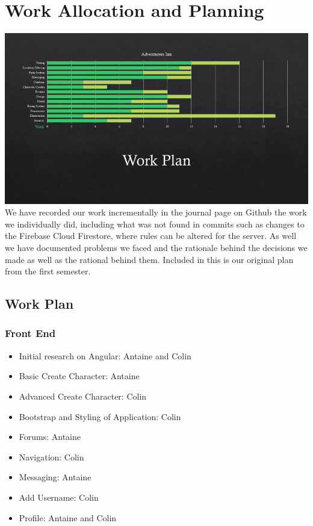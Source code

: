\section{Work Allocation and Planning}
\includegraphics[scale=0.8]{./img/WorkPlanOrginal.png}
We have recorded our work incrementally in the journal page on Github the work we individually did, including what was not found in commits such as changes to the Firebase Cloud Firestore, where rules can be altered for the server. As well we have documented problems we faced and the rationale behind the decisions we made as well as the rational behind them. Included in this is our original plan from the first semester.

\subsection{Work Plan}
\subsubsection{Front End}
\begin{itemize}
    \item Initial research on Angular: Antaine and Colin  
    \item Basic Create Character: Antaine  
    \item Advanced Create Character: Colin
    \item Bootstrap and Styling of Application: Colin  
    \item Forums: Antaine
    \item Navigation: Colin
    \item Messaging: Antaine 
    \item Add Username: Colin
    \item Profile: Antaine and Colin
\end{itemize}
